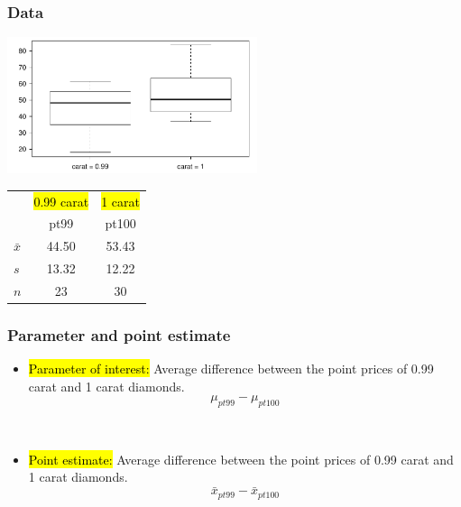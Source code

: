 \begin{frame}[fragile]
\frametitle{Data}

\begin{center}
\includegraphics[width=0.55\textwidth]{7-3_diff_two_mean/figures/diamonds/diamondBox.pdf}
\end{center}

{\small
\begin{center}
\begin{tabular}{l | c | c}
		& {\footnotesize \hl{0.99 carat}} &  {\footnotesize \hl{1 carat}}  \\
		& pt99	& pt100 \\
\hline
$\bar{x}$	& 44.50		& 53.43 \\
$s$		& 13.32		& 12.22 \\
$n$		& 23			& 30
\end{tabular}
\end{center}
}


\end{frame}


\begin{frame}
\frametitle{Parameter and point estimate}

\begin{itemize}

\item \hl{Parameter of interest:} Average difference between the point prices of  0.99 carat and 1 carat diamonds.
\[ \mu_{pt99} - \mu_{pt100} \]

$\:$ \\

\pause

\item \hl{Point estimate:} Average difference between the point prices of   0.99 carat and 1 carat diamonds.
\[ \bar{x}_{pt99} - \bar{x}_{pt100} \]

\end{itemize}

\end{frame}

